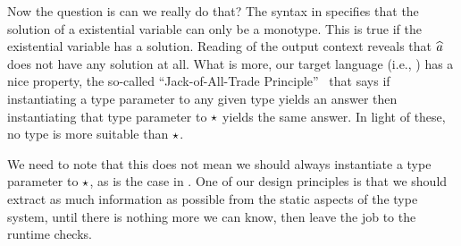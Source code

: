Now the question is can we really do that? The syntax in 
specifies that the solution of a existential variable can only be a monotype.
This is true if the existential variable has a solution. Reading of the output
context reveals that $\widehat{a}$ does not have any solution at all. What is more,
our target language (i.e., \pbc) has a nice property, the so-called
``Jack-of-All-Trade Principle''~\cite{ahmed2011blame} that says if instantiating
a type parameter to any given type yields an answer then instantiating that type
parameter to $\star$ yields the same answer. In light of these, no type is
more suitable than $\star$.

We need to note that this does not mean we should always instantiate a type
parameter to $\star$, as is the case in \pbc. One of our design principles is
that we should extract as much information as possible from the static aspects of
the type system, until there is nothing more we can know, then leave the job to
the runtime checks.



